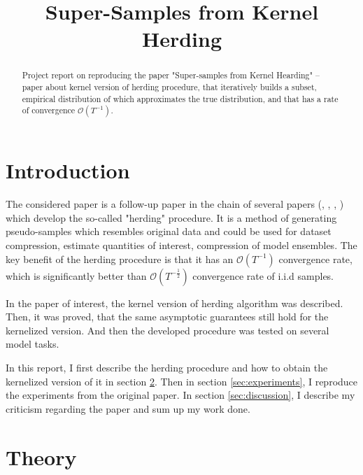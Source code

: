 \documentclass[tablecaption=bottom,wcp]{jmlr} %
\title[Project Report]{Super-Samples from Kernel Herding}
\author{\Name{Georgii Novikov}}
\begin{document}
\maketitle

\begin{abstract}
Project report on reproducing the paper "Super-samples from Kernel Hearding" \cite{Chen2012} -- paper about kernel version of herding procedure, that iteratively builds a subset, empirical distribution of which approximates the true distribution, and that has a rate of convergence $\mathcal{O}(T^{-1})$.
\end{abstract}


\section{Introduction}
    The considered paper \cite{Chen2012} is a follow-up paper in the chain of several papers (\cite{Chen2010}, \cite{Welling2010}, \cite{Welling2}, \cite{Welling3}) which develop the so-called "herding" procedure. It is a method of generating pseudo-samples which resembles original data and could be used for dataset compression, estimate quantities of interest, compression of model ensembles. The key benefit of the herding procedure is that it has an $\mathcal{O}(T^{-1})$ convergence rate, which is significantly better than $\mathcal{O}(T^{-\frac{1}{2}})$ convergence rate of i.i.d samples.

    In the paper of interest, the kernel version of herding algorithm was described. Then, it was proved, that the same asymptotic guarantees still hold for the kernelized version. And then the developed procedure was tested on several model tasks.

    In this report, I first describe the herding procedure and how to obtain the kernelized version of it in section \ref{sec:theory}. Then in section \ref{sec:experiments}, I reproduce the experiments from the original paper. In section \ref{sec:discussion}, I describe my criticism regarding the paper and sum up my work done.


\section{Theory} \label{sec:theory}
\end{document}
